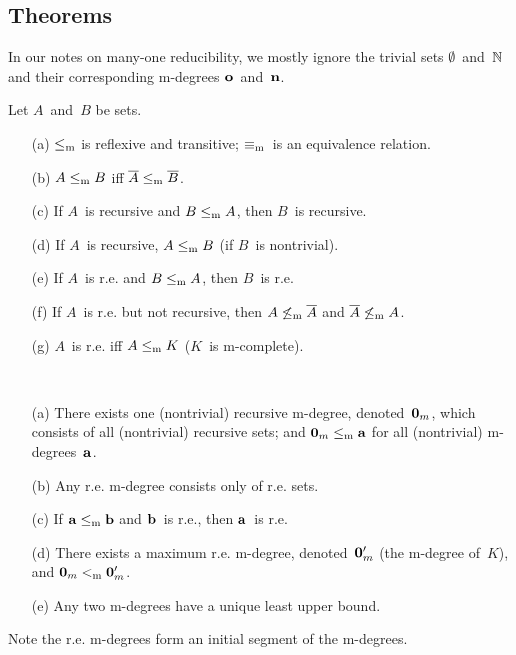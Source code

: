 %
%
%
\subsection*{Theorems}
In our notes on many-one reducibility, we mostly ignore the trivial sets \(\emptyset\)~and~\(\mathbb{N}\) and their corresponding m-degrees \(\mathbf{{o}}\)~and~\(\mathbf{{n}}\).

\begin{thm}
Let \(A\)~and~\(B\) be sets.
\begin{enumerate}[itemsep=0pt]
\item[(a)] \(\mathrel{\le_{\mathrm{m}}}\) is reflexive and transitive; \(\mathrel{\equiv_{\mathrm{m}}}\)~is an equivalence relation.
\item[(b)] \(A\mathrel{\le_{\mathrm{m}}} B\) iff \(\overline{A}\mathrel{\le_{\mathrm{m}}}\overline{B}\).
\item[(c)] If \(A\)~is recursive and \(B\mathrel{\le_{\mathrm{m}}} A\), then \(B\)~is recursive.
\item[(d)] If \(A\)~is recursive, \(A\mathrel{\le_{\mathrm{m}}} B\) (if \(B\)~is nontrivial).
\item[(e)] If \(A\)~is r.e. and \(B\mathrel{\le_{\mathrm{m}}} A\), then \(B\)~is r.e.
\item[(f)] If \(A\)~is r.e. but not recursive, then \(A\not\mathrel{\le_{\mathrm{m}}}\overline{A}\) and \(\overline{A}\not\mathrel{\le_{\mathrm{m}}} A\).
\item[(g)] \(A\)~is r.e. iff \(A\mathrel{\le_{\mathrm{m}}} K\) (\(K\)~is m-complete).
\end{enumerate}
\end{thm}

\begin{thm}
\ 
\begin{enumerate}[itemsep=0pt]
\item[(a)] There exists one (nontrivial) recursive m-degree, denoted~\(\mathbf{{0}}_m\), which consists of all (nontrivial) recursive sets; and \(\mathbf{{0}}_m\mathrel{\le_{\mathrm{m}}}\mathbf{{a}}\) for all (nontrivial) m-degrees~\(\mathbf{{a}}\).
\item[(b)] Any r.e. m-degree consists only of r.e. sets.
\item[(c)] If \(\mathbf{{a}}\mathrel{\le_{\mathrm{m}}}\mathbf{{b}}\) and \(\mathbf{{b}}\)~is r.e., then \(\mathbf{{a}}\)~is r.e.
\item[(d)] There exists a maximum r.e. m-degree, denoted~\(\mathbf{{0}}_m'\) (the m-degree of~\(K\)), and \(\mathbf{{0}}_m\mathrel{<_{\mathrm{m}}}\mathbf{{0}}_m'\).
\item[(e)] Any two m-degrees have a unique least upper bound.
\end{enumerate}
\end{thm}
\begin{rmk}
Note the r.e. m-degrees form an initial segment of the m-degrees.
\end{rmk}

